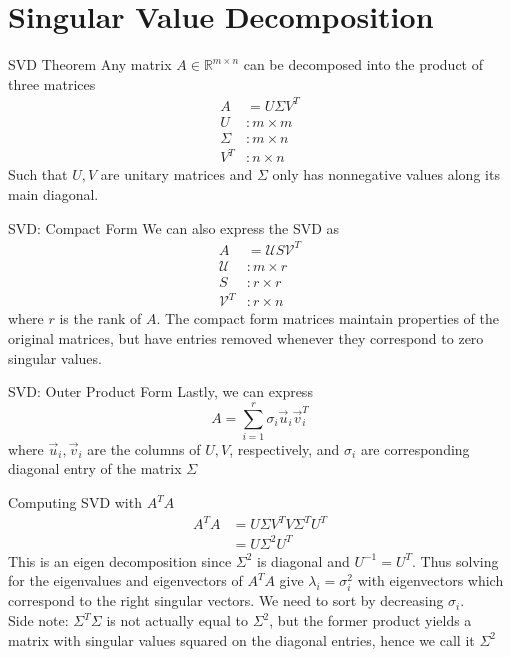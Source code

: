
	\section{Singular Value Decomposition}

    \begin{frame}{SVD Theorem}
		Any matrix $A \in \mathbb{R}^{m \times n}$ can be decomposed into the product of three matrices
		\begin{align*}
			A &= U \Sigma V^T \\
			U &: m \times m \\
			\Sigma &: m \times n \\
			V^T &: n \times n
		\end{align*}
		Such that $U, V$ are unitary matrices and $\Sigma$ only has nonnegative values along its main diagonal.

    \end{frame}

    \begin{frame}{SVD: Compact Form}
        We can also express the SVD as
		\begin{align*}
			A &= \mathcal{U} S \mathcal{V}^T \\
			\mathcal{U} &: m \times r \\
			S &: r \times r \\
			\mathcal{V}^T &: r \times n
		\end{align*}
		where $r$ is the rank of $A$. The compact form matrices maintain properties of the original matrices, but have entries removed whenever they correspond to zero singular values.

    \end{frame}


    \begin{frame}{SVD: Outer Product Form}
		Lastly, we can express
		\[ A = \sum_{i = 1}^r \sigma_i \vec{u}_i \vec{v}_i^T \]
		where $\vec{u}_i, \vec{v}_i$ are the columns of $U, V$, respectively, and $\sigma_i$ are corresponding diagonal entry of the matrix $\Sigma$
    \end{frame}

    \begin{frame}{Computing SVD with $A^T A$}
		\begin{align*}
			A^T A &= U \Sigma V^T V \Sigma^T U^T \\
			&= U \Sigma^2 U^T
		\end{align*}
		This is an eigen decomposition since $\Sigma^2$ is diagonal and $U^{-1} = U^T$. Thus solving for the eigenvalues and eigenvectors of $A^T A$ give $\lambda_i = \sigma_i^2$ with eigenvectors which correspond to the right singular vectors. We need to sort by decreasing $\sigma_i$. \\

        \alert{Side note:} $\Sigma^T \Sigma$ is not actually equal to $\Sigma^2$, but the former product yields a matrix with singular values squared on the diagonal entries, hence we call it $\Sigma^2$
    \end{frame}

